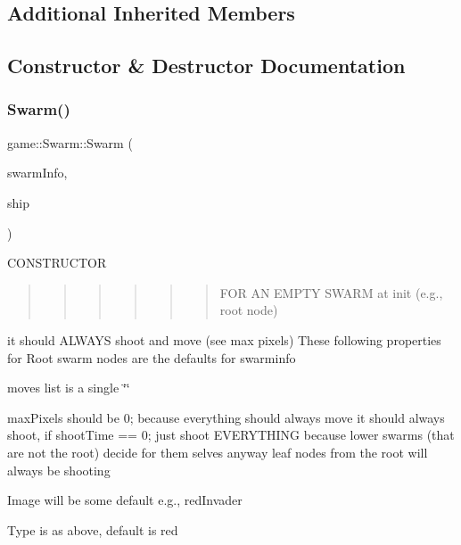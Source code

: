 \subsection*{Additional Inherited Members}


\subsection{Constructor \& Destructor Documentation}
\mbox{\label{classgame_1_1Swarm_abb77569228eb93b30ba187991a1c9a6b}} 
\subsubsection{\texorpdfstring{Swarm()}{Swarm()}}
{\footnotesize\ttfamily game\+::\+Swarm\+::\+Swarm (\begin{DoxyParamCaption}\item[{\hyperlink{classgame_1_1SwarmInfo}{Swarm\+Info} \&}]{swarm\+Info,  }\item[{\hyperlink{classgame_1_1Base}{Base} \&}]{ship }\end{DoxyParamCaption})}

C\+O\+N\+S\+T\+R\+U\+C\+T\+OR \begin{quote}
\begin{quote}
\begin{quote}
\begin{quote}
\begin{quote}
\begin{quote}
F\+OR AN E\+M\+P\+TY S\+W\+A\+RM at init (e.\+g., root node) \end{quote}
\end{quote}
\end{quote}
\end{quote}
\end{quote}
\end{quote}
it should A\+L\+W\+A\+YS shoot and move (see max pixels) These following properties for Root swarm nodes are the defaults for swarminfo
\begin{DoxyItemize}
\item moves list is a single \char`\"{}\char`\"{}
\item max\+Pixels should be 0; because everything should always move it should always shoot, if shoot\+Time == 0; just shoot E\+V\+E\+R\+Y\+T\+H\+I\+NG because lower swarms (that are not the root) decide for them selves anyway leaf nodes from the root will always be shooting
\item Image will be some default e.\+g., red\+Invader
\item Type is as above, default is red
\end{DoxyItemize}

